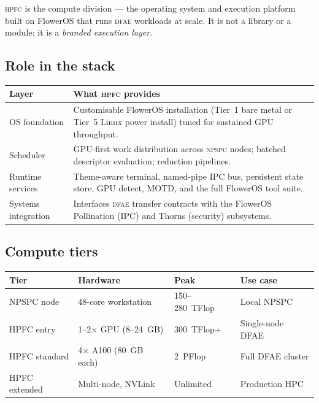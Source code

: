 \documentclass[11pt,a4paper]{article}
\theoremstyle{definition}
\theoremstyle{plain}
\newcommand{\DFAE}{\textsc{dfae}}
\newcommand{\NPSPC}{\textsc{npspc}}
\newcommand{\HPFC}{\textsc{hpfc}}
\begin{document}
\HPFC{} is the compute division --- the operating system and
execution platform built on FlowerOS that runs \DFAE{} workloads
at scale.  It is not a library or a module; it is a \emph{branded
execution layer}.

\subsection{Role in the stack}

\begin{center}
\begin{tabular}{@{}lp{9cm}@{}}
\toprule
\textbf{Layer} & \textbf{What \HPFC{} provides} \\
\midrule
OS foundation &
  Customisable FlowerOS installation (Tier~1 bare metal or
  Tier~5 Linux power install) tuned for sustained GPU throughput. \\
\addlinespace
Scheduler &
  GPU-first work distribution across \NPSPC{} nodes; batched
  descriptor evaluation; reduction pipelines. \\
\addlinespace
Runtime services &
  Theme-aware terminal, named-pipe IPC bus, persistent state
  store, GPU detect, MOTD, and the full FlowerOS tool suite. \\
\addlinespace
Systems integration &
  Interfaces \DFAE{} transfer contracts with the FlowerOS
  Pollination (IPC) and Thorns (security) subsystems. \\
\bottomrule
\end{tabular}
\end{center}

\subsection{Compute tiers}

\begin{center}
\begin{tabular}{@{}llll@{}}
\toprule
\textbf{Tier} & \textbf{Hardware} & \textbf{Peak} & \textbf{Use case} \\
\midrule
NPSPC node    & 48-core workstation          & 150--280~TFlop & Local NPSPC \\
HPFC entry    & 1--2$\times$ GPU (8--24~GB)  & 300~TFlop+     & Single-node DFAE \\
HPFC standard & 4$\times$ A100 (80~GB each)  & 2~PFlop        & Full DFAE cluster \\
HPFC extended & Multi-node, NVLink           & Unlimited      & Production HPC \\
\bottomrule
\end{tabular}
\end{center}
\end{document}
